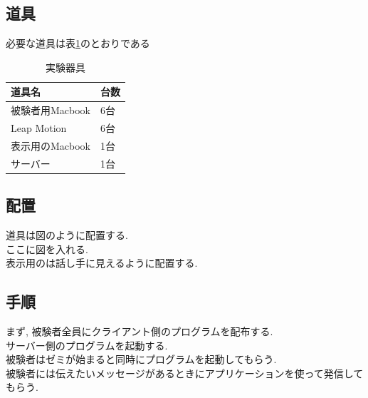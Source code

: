 \documentclass{funthesis}
\begin{document}
\subsection{道具}
必要な道具は表\ref{tools}のとおりである

\begin{table}[H]
\begin{center}
\caption{実験器具}
  \begin{tabular}{ll}
   \hline
   道具名 & 台数\\
\hline
被験者用Macbook & 6台\\
\hline
Leap Motion & 6台\\ 
  \hline
表示用のMacbook & 1台\\ 
  \hline
  サーバー & 1台\\ 
  \hline
  \end{tabular}
  \label{tools}
  \end{center}
\end{table}

\subsection{配置}
道具は図のように配置する. \\

ここに図を入れる.\\

表示用のは話し手に見えるように配置する.

\subsection{手順}
まず, 被験者全員にクライアント側のプログラムを配布する.\\
サーバー側のプログラムを起動する. \\
被験者はゼミが始まると同時にプログラムを起動してもらう. \\
被験者には伝えたいメッセージがあるときにアプリケーションを使って発信してもらう. \\



\end{document}
